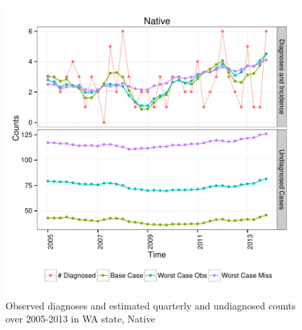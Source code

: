 \documentclass{article}\usepackage[]{graphicx}\usepackage[]{color}
\makeatletter
\def\maxwidth{ %
  \ifdim\Gin@nat@width>\linewidth
    \linewidth
  \else
    \Gin@nat@width
  \fi
}
\newenvironment{knitrout}{}{} %
\makeatother
\begin{document}
\begin{knitrout}\footnotesize
{}\color{fgcolor}\begin{figure}[]


{\centering \includegraphics[width=\maxwidth]{figure/minimal-plot_subgroup_Native} 

}

\caption[Observed diagnoses and estimated quarterly and undiagnosed counts over 2005-2013 in WA state, Native]{Observed diagnoses and estimated quarterly and undiagnosed counts over 2005-2013 in WA state, Native\label{fig:plot_subgroup_Native}}
\end{figure}


\end{knitrout}
\end{document}
